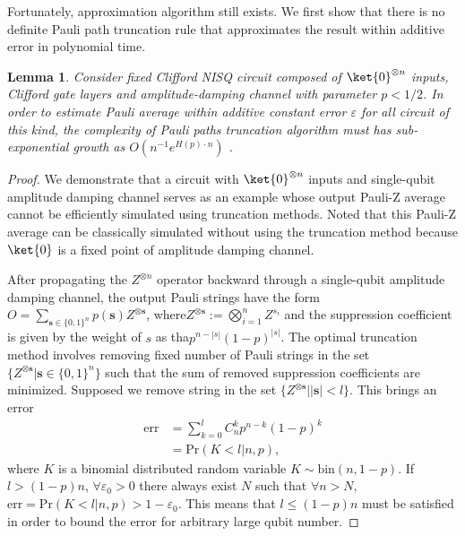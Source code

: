 \documentclass[aps,%
twocolumn,%
floatfix,%
pra,%
amsfonts,%
longbibliography,%
groupedaddress,%
superscriptaddress]{revtex4-2}%
\newtheorem{lemma}{Lemma}
\newcommand{\1}{\mathbbm{1}}
\begin{document}
Fortunately, approximation algorithm still exists. We first show that there is no definite Pauli path truncation rule that approximates the result within additive error in polynomial time.
\begin{lemma}
\label{lemma:nogo-truncation}
    Consider fixed Clifford NISQ circuit composed of $\ket{0}^{\otimes n}$ inputs, Clifford gate layers and amplitude-damping channel with parameter $p<1/2$.  In order to estimate Pauli average within additive constant error $\varepsilon$ for all circuit of this kind, the complexity of Pauli paths truncation algorithm must has sub-exponential growth as $O(n^{-1}e^{H(p) \cdot n})$ . 
\end{lemma}
\begin{proof}
    We demonstrate that a circuit with $\ket{0}^{\otimes n}$ inputs and single-qubit amplitude damping channel serves as an example whose output Pauli-Z average cannot be efficiently simulated using truncation methods. Noted that this Pauli-Z average can be classically simulated without using the truncation method because $\ket{0}$ is a fixed point of amplitude damping channel.
    
    After propagating the $Z^{\otimes n}$ operator backward through a single-qubit amplitude damping channel, the output Pauli strings have the form $O = \sum_{\mathbf{s} \in \{0,1\}^n}p(\mathbf{s})Z^{\otimes \mathbf{s}}$, where$Z^{\otimes \mathbf{s}} := \bigotimes_{i =1}^{n} Z^{s_i}$ and the suppression coefficient is given by the weight of $s$ as  tha$p^{n-|s|} (1-p)^{|s|}$. The optimal truncation method involves removing fixed number of Pauli strings in the set $\{Z^{\otimes {\mathbf s}}|\mathbf{s} \in \{0,1\}^n\}$ such that the sum of removed suppression coefficients are minimized. 
    Supposed we remove string in the set $\{Z^{\otimes \mathbf s}| |\mathbf{s}|< l\}$. This brings an error
\begin{align}
        \text{err} &= \sum_{k = 0}^{l} C_{n}^k p^{ n -k}(1-p)^k\\
        &=\text{Pr}( K<l|n,p ),
    \end{align}
where $K$ is a binomial distributed random variable $K\sim \text{bin}(n,1-p)$.
If $l > (1-p)n$, $\forall \varepsilon_0>0$ there always exist $N$ such that $\forall n >N$,  $\text{err}=\text{Pr}( K<l|n,p )>1 - \varepsilon_0 $. This means that $l\leq (1-p)n$ must be satisfied in order to bound the error for arbitrary large qubit number.


\end{proof}
\end{document}

